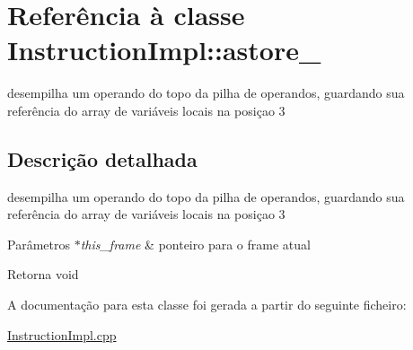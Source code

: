\hypertarget{class_instruction_impl_1_1astore__3}{}\section{Referência à classe Instruction\+Impl\+:\+:astore\+\_}
\label{class_instruction_impl_1_1astore__3}


desempilha um operando do topo da pilha de operandos, guardando sua referência do array de variáveis locais na posiçao 3  




\subsection{Descrição detalhada}
desempilha um operando do topo da pilha de operandos, guardando sua referência do array de variáveis locais na posiçao 3 


\begin{DoxyParams}{Parâmetros}
{\em $\ast$this\+\_\+frame} & ponteiro para o frame atual \\
\hline
\end{DoxyParams}
\begin{DoxyReturn}{Retorna}
void 
\end{DoxyReturn}


A documentação para esta classe foi gerada a partir do seguinte ficheiro\+:\begin{DoxyCompactItemize}
\item 
\hyperlink{_instruction_impl_8cpp}{Instruction\+Impl.\+cpp}\end{DoxyCompactItemize}
